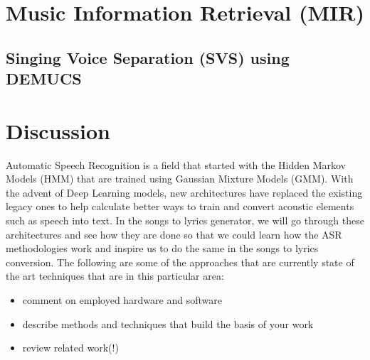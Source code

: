 \section{Music Information Retrieval (MIR)}%
\label{sec:musicinformationretrieval}

\subsection{Singing Voice Separation (SVS) using DEMUCS}%
\label{sec:demucs}

\section{Discussion}%
\label{sec:foundationaltheorydiscussion}

Automatic Speech Recognition is a field that started with the Hidden Markov Models (HMM) that are trained using Gaussian Mixture Models (GMM). With the advent of Deep Learning models, new architectures have replaced the existing legacy ones to help calculate better ways to train and convert acoustic elements such as speech into text. In the songs to lyrics generator, we will go through these architectures and see how they are done so that we could learn how the ASR methodologies work and inspire us to do the same in the songs to lyrics conversion. The following are some of the approaches that are currently state of the art techniques that are in this particular area:

\begin{itemize}
    \item comment on employed hardware and software
    \item describe methods and techniques that build the basis of your work
    \item review related work(!)

    
\end{itemize}
